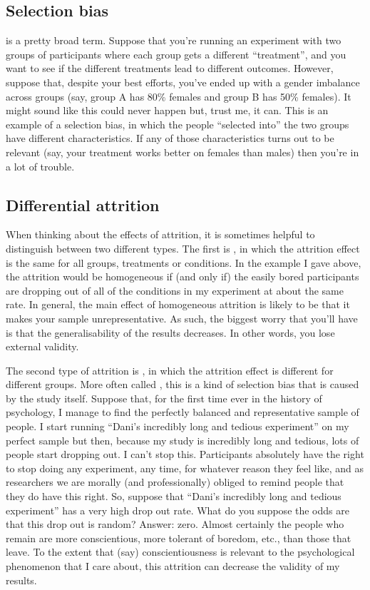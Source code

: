 \subsection{Selection bias} 

 is a pretty broad term. Suppose that you're running an experiment with two groups of participants where each group gets a different ``treatment'', and you want to see if the different treatments lead to different outcomes. However, suppose that, despite your best efforts, you've ended up with a gender imbalance across groups (say, group A has 80\% females and group B has 50\% females). It might sound like this could never happen but, trust me, it can. This is an example of a selection bias, in which the people ``selected into'' the two groups have different characteristics. If any of those characteristics turns out to be relevant (say, your treatment works better on females than males) then you're in a lot of trouble. 

\subsection{Differential attrition}

When thinking about the effects of attrition, it is sometimes helpful to distinguish between two different types. The first is , in which the attrition effect is the same for all groups, treatments or conditions. In the example I gave above, the attrition would be homogeneous if (and only if) the easily bored participants are dropping out of all of the conditions in my experiment at about the same rate. In general, the main effect of homogeneous attrition is likely to be that it makes your sample unrepresentative. As such, the biggest worry that you'll have is that the generalisability of the results decreases. In other words, you lose external validity.

The second type of attrition is , in which the attrition effect is different for different groups. More often called , this is a kind of selection bias that is caused by the study itself. Suppose that, for the first time ever in the history of psychology, I manage to find the perfectly balanced and representative sample of people. I start running ``Dani's incredibly long and tedious experiment'' on my perfect sample but then, because my study is incredibly long and tedious, lots of people start dropping out. I can't stop this. Participants absolutely have the right to stop doing any experiment, any time, for whatever reason they feel like, and as researchers we are morally (and professionally) obliged to remind people that they do have this right. So, suppose that ``Dani's incredibly long and tedious experiment'' has a very high drop out rate. What do you suppose the odds are that this drop out is random? Answer: zero. Almost certainly the people who remain are more conscientious, more tolerant of boredom, etc., than those that leave. To the extent that (say) conscientiousness is relevant to the psychological phenomenon that I care about, this attrition can decrease the validity of my results.

